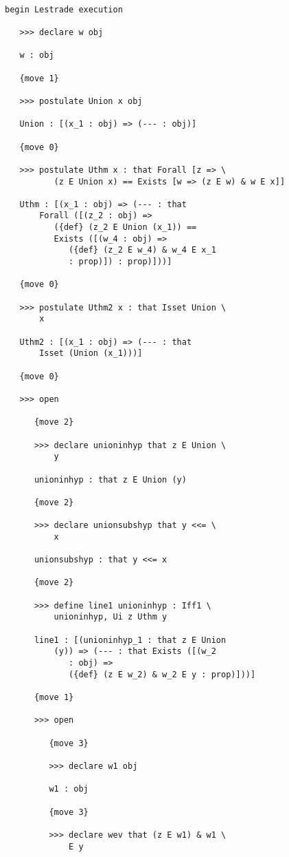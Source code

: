\documentclass[12pt]{article}
\begin{document}
\begin{verbatim}

begin Lestrade execution

   >>> declare w obj

   w : obj

   {move 1}

   >>> postulate Union x obj

   Union : [(x_1 : obj) => (--- : obj)]

   {move 0}

   >>> postulate Uthm x : that Forall [z => \
          (z E Union x) == Exists [w => (z E w) & w E x]]

   Uthm : [(x_1 : obj) => (--- : that 
       Forall ([(z_2 : obj) => 
          ({def} (z_2 E Union (x_1)) == 
          Exists ([(w_4 : obj) => 
             ({def} (z_2 E w_4) & w_4 E x_1 
             : prop)]) : prop)]))]

   {move 0}

   >>> postulate Uthm2 x : that Isset Union \
       x

   Uthm2 : [(x_1 : obj) => (--- : that 
       Isset (Union (x_1)))]

   {move 0}

   >>> open

      {move 2}

      >>> declare unioninhyp that z E Union \
          y

      unioninhyp : that z E Union (y)

      {move 2}

      >>> declare unionsubshyp that y <<= \
          x

      unionsubshyp : that y <<= x

      {move 2}

      >>> define line1 unioninhyp : Iff1 \
          unioninhyp, Ui z Uthm y

      line1 : [(unioninhyp_1 : that z E Union 
          (y)) => (--- : that Exists ([(w_2 
             : obj) => 
             ({def} (z E w_2) & w_2 E y : prop)]))]

      {move 1}

      >>> open

         {move 3}

         >>> declare w1 obj

         w1 : obj

         {move 3}

         >>> declare wev that (z E w1) & w1 \
             E y


\end{verbatim}
\end{document}
